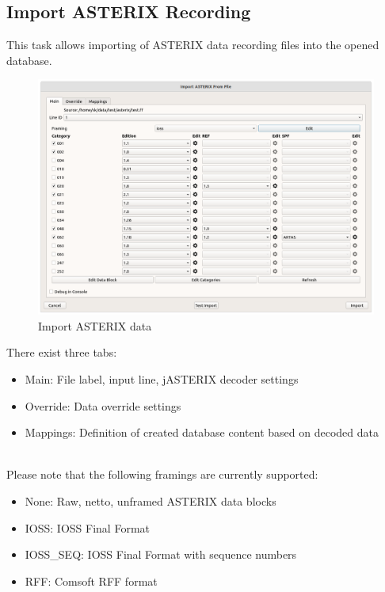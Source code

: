 \subsection{Import ASTERIX Recording}
\label{sec:ui_import_asterix}

This task allows importing of ASTERIX data recording files into the opened database. \\

\begin{figure}[H]
  \center
    \hspace*{-0.5cm}
    \includegraphics[width=17cm]{figures/asterix_import_data.png}
  \caption{Import ASTERIX data}
\end{figure}

There exist three tabs:

\begin{itemize}
\item Main: File label, input line, jASTERIX decoder settings
\item Override: Data override settings
\item Mappings: Definition of created database content based on decoded data
\end{itemize}
\ \\

Please note that the following framings are currently supported:

\begin{itemize}
\item None: Raw, netto, unframed ASTERIX data blocks
\item IOSS: IOSS Final Format
\item IOSS\_SEQ: IOSS Final Format with sequence numbers
\item RFF: Comsoft RFF format
\end{itemize}
\ \\


